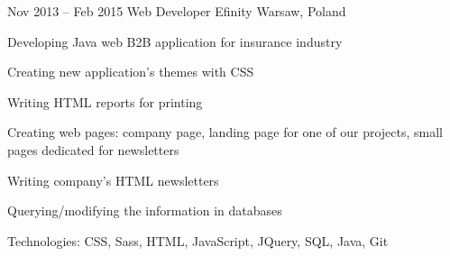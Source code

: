 \begin{sectionlist}
    \sectionlistitemjob
        {Nov 2013 -- Feb 2015}
        {Web Developer}
        {Efinity}
        {Warsaw, Poland}
        {
            \begin{joblisting}
                \item Developing Java web B2B application for insurance
                    industry
                \item Creating new application's themes with CSS
                \item Writing HTML reports for printing
                \item Creating web pages: company page, landing page for one
                    of our projects, small pages dedicated for newsletters
                \item Writing company's HTML newsletters
                \item Querying/modifying the information in databases
                \item Technologies: CSS, Sass, HTML, JavaScript, JQuery,
                    SQL, Java, Git
            \end{joblisting}
        }

\end{sectionlist}
